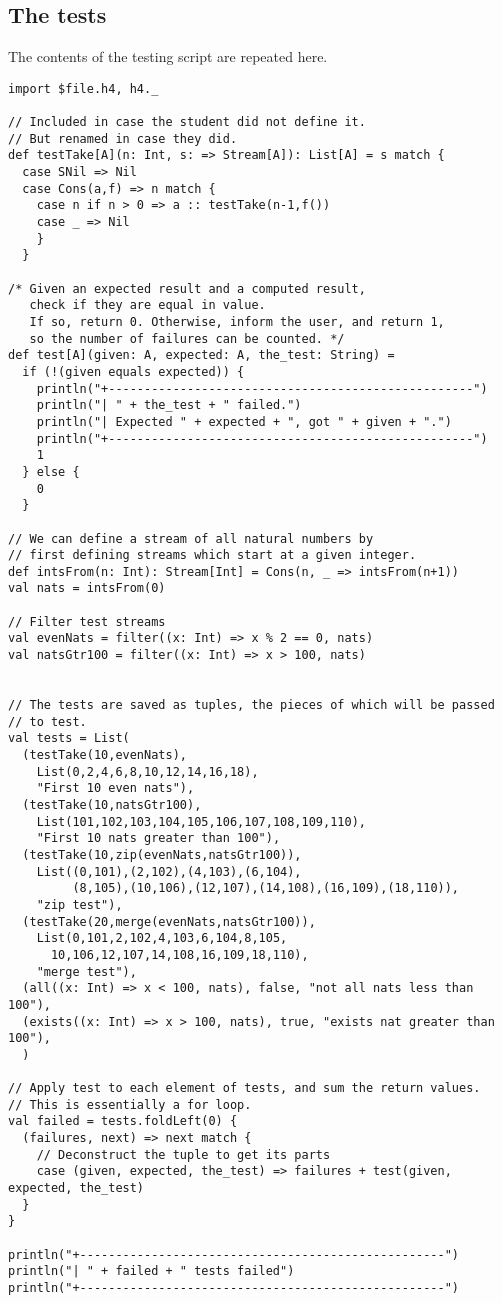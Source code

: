 \documentclass[11pt]{article}
\begin{document}
\subsection*{The tests}
\label{sec:orgb8d6996}
The contents of the testing script are repeated here.

\begin{verbatim}
import $file.h4, h4._

// Included in case the student did not define it.
// But renamed in case they did.
def testTake[A](n: Int, s: => Stream[A]): List[A] = s match {
  case SNil => Nil
  case Cons(a,f) => n match {
    case n if n > 0 => a :: testTake(n-1,f())
    case _ => Nil
    }
  }

/* Given an expected result and a computed result,
   check if they are equal in value.
   If so, return 0. Otherwise, inform the user, and return 1,
   so the number of failures can be counted. */
def test[A](given: A, expected: A, the_test: String) =
  if (!(given equals expected)) {
    println("+---------------------------------------------------")
    println("| " + the_test + " failed.")
    println("| Expected " + expected + ", got " + given + ".")
    println("+---------------------------------------------------")
    1
  } else {
    0
  }

// We can define a stream of all natural numbers by
// first defining streams which start at a given integer.
def intsFrom(n: Int): Stream[Int] = Cons(n, _ => intsFrom(n+1))
val nats = intsFrom(0)

// Filter test streams
val evenNats = filter((x: Int) => x % 2 == 0, nats)
val natsGtr100 = filter((x: Int) => x > 100, nats)


// The tests are saved as tuples, the pieces of which will be passed
// to test.
val tests = List(
  (testTake(10,evenNats),
    List(0,2,4,6,8,10,12,14,16,18),
    "First 10 even nats"),
  (testTake(10,natsGtr100),
    List(101,102,103,104,105,106,107,108,109,110),
    "First 10 nats greater than 100"),
  (testTake(10,zip(evenNats,natsGtr100)),
    List((0,101),(2,102),(4,103),(6,104),
         (8,105),(10,106),(12,107),(14,108),(16,109),(18,110)),
    "zip test"),
  (testTake(20,merge(evenNats,natsGtr100)),
    List(0,101,2,102,4,103,6,104,8,105,
      10,106,12,107,14,108,16,109,18,110),
    "merge test"),
  (all((x: Int) => x < 100, nats), false, "not all nats less than 100"),
  (exists((x: Int) => x > 100, nats), true, "exists nat greater than 100"),
  )

// Apply test to each element of tests, and sum the return values.
// This is essentially a for loop.
val failed = tests.foldLeft(0) {
  (failures, next) => next match {
    // Deconstruct the tuple to get its parts
    case (given, expected, the_test) => failures + test(given, expected, the_test)
  }
}

println("+---------------------------------------------------")
println("| " + failed + " tests failed")
println("+---------------------------------------------------")
\end{verbatim}
\end{document}
